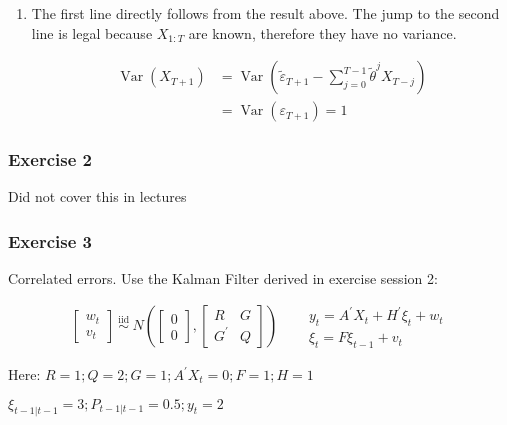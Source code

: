 {{\begin{enumerate}[label=(\alph*)]
{\begin{enumerate}[label=(\roman*)]
    $$
    \mathbb{E}_{T}\left(X_{T+1}\right)=-\tilde{\theta} \sum_{j=0}^{T-1} \tilde{\theta}^{j} X_{T-j}
    $$
    \item 
    The first line directly follows from the result above. The jump to the second line is legal because $X_{1:T}$ are known, therefore they have no variance.
    
    $$
    \begin{aligned}
    \operatorname{Var}\left(X_{T+1}\right) & =\operatorname{Var}\left(\tilde{\varepsilon}_{T+1}-\sum_{j=0}^{T-1} \tilde{\theta}^{j} X_{T-j}\right) \\
    & =\operatorname{Var}\left(\varepsilon_{T+1}\right)=1
    \end{aligned}
    $$
\end{enumerate}
}
\end{enumerate}
}
{
\subsubsection*{Exercise 2}

\color{blue} Did not cover this in lectures \color{black}
}
{
\subsubsection*{Exercise 3}
Correlated errors. Use the Kalman Filter derived in exercise session 2:

$$
\left[\begin{array}{l}
    w_{t} \\ v_{t}
\end{array}\right] 
\stackrel{\text { iid }}{\sim} 
N\left(\left[\begin{array}{l}
    0 \\ 0
\end{array}\right],
\left[\begin{array}{ll}
    R & G \\ 
    G^{\prime} & Q
\end{array}\right]\right) \quad 
\begin{aligned} 
    & y_{t}=A^{\prime} X_{t}+H^{\prime} \xi_{t}+w_{t} \\ 
    & \xi_{t}=F \xi_{t-1}+v_{t}
\end{aligned}
$$


Here: $R=1 ; Q=2 ; G=1 ; A^{\prime} X_{t}=0 ; F=1 ; H=1$

$\xi_{t-1 | t-1}=3 ; P_{t-1 | t-1}=0.5 ; y_{t}=2$

}}
